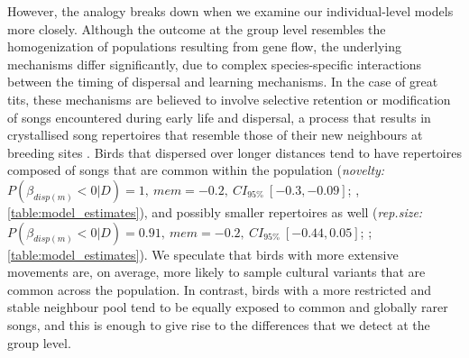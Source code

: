 \documentclass[9pt, twocolumn, twoside]{gsajnl}
\begin{document}
However, the analogy breaks down when we examine our individual-level models more closely. Although the outcome at the group level resembles the homogenization of populations resulting from gene flow, the underlying mechanisms differ significantly, due to complex species-specific interactions between the timing of dispersal and learning mechanisms. In the case of great tits, these mechanisms are believed to involve selective retention or modification of songs encountered during early life and dispersal, a process that results in crystallised song repertoires that resemble those of their new neighbours at breeding sites \parencite{marler1982, peters2017, nelson1992}. Birds that dispersed over longer distances tend to have repertoires composed of songs that are common within the population (\textit{novelty:} $P(\beta_{disp (m)} < 0 | D) = 1,~mem = -0.2,~CI_{95\%}~[-0.3, -0.09]$; , \autoref{table:model_estimates}), and possibly smaller repertoires as well (\textit{rep.size:} $P(\beta_{disp (m)} < 0 | D) = 0.91,~mem = -0.2,~CI_{95\%}~[-0.44, 0.05]$; ; \autoref{table:model_estimates}). We speculate that birds with more extensive movements are, on average, more likely to sample cultural variants that are common across the population. In contrast, birds with a more restricted and stable neighbour pool tend to be equally exposed to common and globally rarer songs, and this is enough to give rise to the differences that we detect at the group level.
\end{document}
